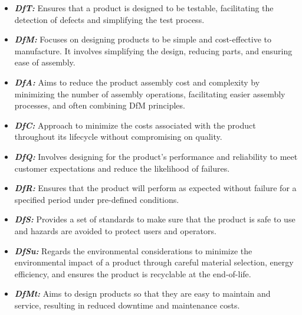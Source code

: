 \begin{itemize}[topsep=8pt,itemsep=4pt,partopsep=4pt, parsep=4pt]

    \item \textbf{\emph{\ac{DfT}:}} Ensures that a product is designed to be
    testable, facilitating the detection of defects and simplifying the test
    process.

    \item \textbf{\emph{\ac{DfM}:}} Focuses on designing products to be simple
    and cost-effective to manufacture. It involves simplifying the design,
    reducing parts, and ensuring ease of assembly.

    \item \textbf{\emph{\ac{DfA}:}} Aims to reduce the product assembly cost and
    complexity by minimizing the number of assembly operations, facilitating
    easier assembly processes, and often combining DfM principles.

    \item \textbf{\emph{\ac{DfC}:}} Approach to minimize the costs associated
    with the product throughout its lifecycle without compromising on quality.

    \item \textbf{\emph{\ac{DfQ}:}}  Involves designing for the product's
    performance and reliability to meet customer expectations and reduce the
    likelihood of failures.

    \item \textbf{\emph{\ac{DfR}:}} Ensures that the product will perform as
    expected without failure for a specified period under pre-defined
    conditions.

    \item \textbf{\emph{\ac{DfS}:}} Provides a set of standards to make sure
    that the product is safe to use and hazards are avoided to protect users and
    operators.

    \item \textbf{\emph{\ac{DfSu}:}} Regards the environmental considerations to
    minimize the environmental impact of a product through careful material
    selection, energy efficiency, and ensures the product is recyclable at the
    end-of-life.

    \item \textbf{\emph{\ac{DfMt}:}} Aims to design products so that they are
    easy to maintain and service, resulting in reduced downtime and maintenance
    costs.

\end{itemize}

